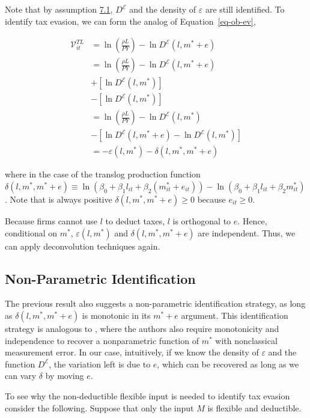 \documentclass[
  12pt]{article}
\theoremstyle{definition}
\theoremstyle{remark}
\begin{document}
Note that by assumption \hyperref[ass-non-ev]{7.1}, \(D^{\mathcal{E}}\)
and the density of \(\varepsilon\) are still identified. To identify tax
evasion, we can form the analog of Equation~\ref{eq-ob-ev},

\[
\begin{aligned}
\mathcal{V}_{it}^{TL} &=\ln\left(\frac{\rho L}{PY}\right)-\ln D^{\mathcal{E}}(l,m^*+e)\\
    &=\ln\left(\frac{\rho L}{PY}\right)-\ln D^{\mathcal{E}}(l,m^*+e)\\
    &+\left[\ln D^{\mathcal{E}}(l,m^*)\right]\\
    &-\left[\ln D^{\mathcal{E}}(l,m^*)\right] \\
    &=\ln\left(\frac{\rho L}{PY}\right)-\ln D^{\mathcal{E}}(l,m^*) \\
    &-\left[\ln D^{\mathcal{E}}(l,m^*+e)-\ln D^{\mathcal{E}}(l,m^*)\right]\\
    &= -\varepsilon(l,m^*) - \delta(l,m^*,m^*+e)
\end{aligned}
\]

where in the case of the translog production function
\(\delta(l,m^*,m^*+e)\equiv \ln \left(\beta_0+\beta_1l_{it}+\beta_2(m^*_{it}+e_{it})\right)-\ln \left(\beta_0+\beta_1l_{it}+\beta_2m^*_{it}\right)\).
Note that is always positive \(\delta(l,m^*,m^*+e)\ge0\) because
\(e_{it}\ge0\).

Because firms cannot use \(l\) to deduct taxes, \(l\) is orthogonal to
\(e\). Hence, conditional on \(m^*\), \(\varepsilon(l,m^*)\) and
\(\delta(l,m^*,m^*+e)\) are independent. Thus, we can apply
deconvolution techniques again.

\subsection{Non-Parametric
Identification}\label{non-parametric-identification}

The previous result also suggests a non-parametric identification
strategy, as long as \(\delta(l,m^*,m^*+e)\) is monotonic in its
\(m^*+e\) argument. This identification strategy is analogous to
\citet{Hu2022b}, where the authors also require monotonicity and
independence to recover a nonparametric function of \(m^*\) with
nonclassical measurement error. In our case, intuitively, if we know the
density of \(\varepsilon\) and the function \(D^{\mathcal{E}}\), the
variation left is due to \(e\), which can be recovered as long as we can
vary \(\delta\) by moving \(e\).

To see why the non-deductible flexible input is needed to identify tax
evasion consider the following. Suppose that only the input \(M\) is
flexible and deductible.
\end{document}
